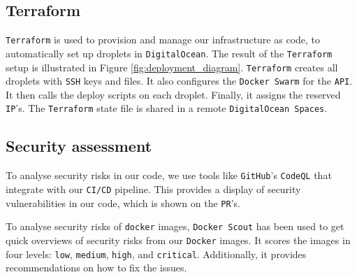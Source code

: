 \subsection{Terraform}
\texttt{Terraform} is used to provision and manage our infrastructure as code, 
to automatically set up droplets in \texttt{DigitalOcean}. 
The result of the \texttt{Terraform} setup is illustrated 
in Figure \ref{fig:deployment_diagram}.
\texttt{Terraform} creates all droplets with \texttt{SSH} keys and files.
It also configures the \texttt{Docker Swarm} for the \texttt{API}.
It then calls the deploy scripts on each droplet.
Finally, it assigns the reserved \texttt{IP}'s.
The \texttt{Terraform} state file is shared in a remote \texttt{DigitalOcean Spaces}.

\subsection{Security assessment}
To analyse security risks in our code, 
we use tools like \texttt{GitHub}'s \texttt{CodeQL}\cite{codeql} that 
integrate with our \texttt{CI/CD} pipeline.
This provides a display of security vulnerabilities in our code,
which is shown on the \texttt{PR}'s.

To analyse security risks of \texttt{docker} images, \texttt{Docker Scout} has been used to get
quick overviews of security risks from our \texttt{Docker} images.
It scores the images in four levels: \texttt{low}, \texttt{medium}, \texttt{high}, and \texttt{critical}.
Additionally, it provides recommendations on how to fix the issues.

